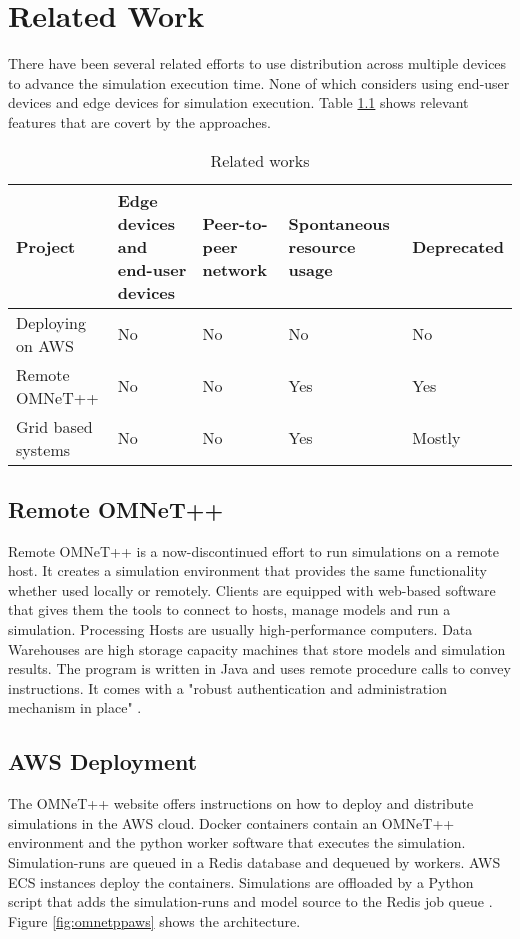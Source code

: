 \chapter{Related Work}

There have been several related efforts to use distribution across multiple devices to advance the simulation execution time. None of which considers using end-user devices and edge devices for simulation execution. Table \ref{tab:relatedworks} shows relevant features that are covert by the approaches.

\begin{table}[h]
\begin{center}
    \begin{tabular}{ | m{10em} | m{6em}| m{6em} | m{6em} | m{5em} | }
      \hline
      Project & Edge devices and end-user devices & Peer-to-peer network & Spontaneous resource usage & Deprecated \\ 
      \hline
      Deploying on AWS & No & No & No & No \\
      \hline
      Remote OMNeT++ & No & No & Yes & Yes \\
      \hline
      Grid based systems & No & No & Yes & Mostly \\
      \hline
    \end{tabular}
    \caption{\label{tab:relatedworks} Related works}
\end{center}
\end{table}


\section{Remote OMNeT++}
Remote OMNeT++ is a now-discontinued effort to run simulations on a remote host. It creates a simulation environment that provides the same functionality whether used locally or remotely. Clients are equipped with web-based software that gives them the tools to connect to hosts, manage models and run a simulation. Processing Hosts are usually high-performance computers. Data Warehouses are high storage capacity machines that store models and simulation results. The program is written in Java and uses remote procedure calls to convey instructions. It comes with a "robust authentication and administration mechanism in place" \cite{erdei2002networked}.

\section{AWS Deployment}
The OMNeT++ website offers instructions on how to deploy and distribute simulations in the AWS cloud. Docker containers contain an OMNeT++ environment and the python worker software that executes the simulation. Simulation-runs are queued in a Redis database and dequeued by workers. AWS ECS instances deploy the containers. Simulations are offloaded by a Python script that adds the simulation-runs and model source to the Redis job queue \cite{omentpp:AWS}. Figure \ref{fig:omnetppaws} shows the architecture.

